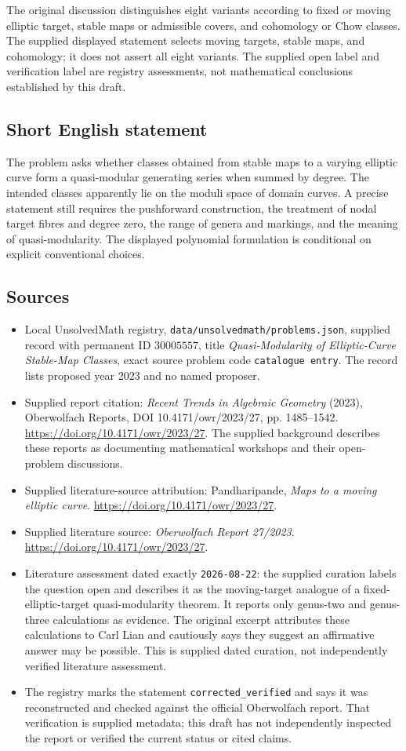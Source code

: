 \documentclass[11pt]{article}
\begin{document}
The original discussion distinguishes eight variants according to fixed or moving elliptic target, stable maps or admissible covers, and cohomology or Chow classes. The supplied displayed statement selects moving targets, stable maps, and cohomology; it does not assert all eight variants. The supplied open label and verification label are registry assessments, not mathematical conclusions established by this draft.
\subsection{Short English statement}
The problem asks whether classes obtained from stable maps to a varying elliptic curve form a quasi-modular generating series when summed by degree. The intended classes apparently lie on the moduli space of domain curves. A precise statement still requires the pushforward construction, the treatment of nodal target fibres and degree zero, the range of genera and markings, and the meaning of quasi-modularity. The displayed polynomial formulation is conditional on explicit conventional choices.
\subsection{Sources}
\begin{itemize}
\item Local UnsolvedMath registry, \texttt{data/unsolvedmath/problems.json}, supplied record with permanent ID \(30005557\), title \emph{Quasi-Modularity of Elliptic-Curve Stable-Map Classes}, exact source problem code \texttt{catalogue entry}. The record lists proposed year 2023 and no named proposer.
\item Supplied report citation: \emph{Recent Trends in Algebraic Geometry} (2023), Oberwolfach Reports, DOI 10.4171/owr/2023/27, pp. 1485--1542. \url{https://doi.org/10.4171/owr/2023/27}. The supplied background describes these reports as documenting mathematical workshops and their open-problem discussions.
\item Supplied literature-source attribution: Pandharipande, \emph{Maps to a moving elliptic curve}. \url{https://doi.org/10.4171/owr/2023/27}.
\item Supplied literature source: \emph{Oberwolfach Report 27/2023}. \url{https://doi.org/10.4171/owr/2023/27}.
\item Literature assessment dated exactly \texttt{2026-08-22}: the supplied curation labels the question open and describes it as the moving-target analogue of a fixed-elliptic-target quasi-modularity theorem. It reports only genus-two and genus-three calculations as evidence. The original excerpt attributes these calculations to Carl Lian and cautiously says they suggest an affirmative answer may be possible. This is supplied dated curation, not independently verified literature assessment.
\item The registry marks the statement \texttt{corrected\_verified} and says it was reconstructed and checked against the official Oberwolfach report. That verification is supplied metadata; this draft has not independently inspected the report or verified the current status or cited claims.
\end{itemize}
\end{document}
